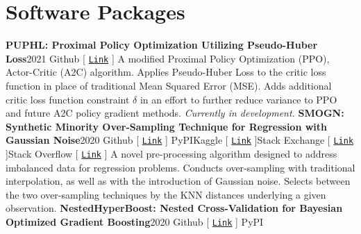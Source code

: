 \documentclass{article}
\begin{document}
    \section*{Software Packages}
        \textbf{PUPHL: Proximal Policy Optimization Utilizing Pseudo-Huber Loss}\hfill{2021}\newline
        \faGithub\space Github [ \href{https://github.com/nickkunz/puphl}{\texttt{Link}} ]\newline\newline
        A modified Proximal Policy Optimization (PPO), Actor-Critic (A2C) algorithm. Applies Pseudo-Huber Loss to the critic loss function in place of traditional Mean Squared Error (MSE). Adds additional critic loss function constraint $\delta$ in an effort to further reduce variance to PPO and future A2C policy gradient methods. \textit{Currently in development.}\newline\newline
        \textbf{SMOGN: Synthetic Minority Over-Sampling Technique for Regression with Gaussian Noise}\hfill{2020}\newline
        \faGithub\space Github [ \href{https://github.com/nickkunz/smogn}{\texttt{Link}} ] \space\faPython\space PyPI\space\faUsers\space Kaggle [ \href{https://www.kaggle.com/aleksandradeis/regression-addressing-extreme-rare-cases}{\texttt{Link}} ]\space\faStackExchange\space Stack Exchange [ \href{https://datascience.stackexchange.com/questions/39232/how-to-make-multiple-regression-perform-better-for-outliers-without-reducing-e/64933#64933}{\texttt{Link}} ]\space\faStackOverflow\space Stack Overflow [ \href{https://stats.stackexchange.com/questions/432185/oversampling-methods-for-numerical-data-regression/434216#434216}{\texttt{Link}} ]\newline\newline
        A novel pre-processing algorithm designed to address imbalanced data for regression problems. Conducts over-sampling with traditional interpolation, as well as with the introduction of Gaussian noise. Selects between the two over-sampling techniques by the KNN distances underlying a given observation.\newline\newline
        \textbf{NestedHyperBoost: Nested Cross-Validation for Bayesian Optimized Gradient Boosting}\hfill{2020}\newline
        \faGithub\space Github [ \href{https://github.com/nickkunz/nestedhyperboost}{\texttt{Link}} ] \space\faPython\space PyPI\newline\newline
\end{document}
